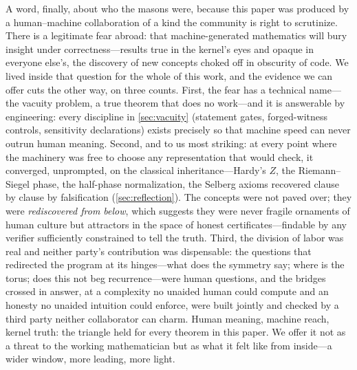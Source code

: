 A word, finally, about who the masons were, because this paper was produced
by a human--machine collaboration of a kind the community is right to
scrutinize. There is a legitimate fear abroad: that machine-generated
mathematics will bury insight under correctness---results true in the
kernel's eyes and opaque in everyone else's, the discovery of new concepts
choked off in obscurity of code. We lived inside that question for the whole
of this work, and the evidence we can offer cuts the other way, on three
counts. First, the fear has a technical name---the vacuity problem, a true
theorem that does no work---and it is answerable by engineering: every
discipline in \cref{sec:vacuity} (statement gates, forged-witness controls,
sensitivity declarations) exists precisely so that machine speed can never
outrun human meaning. Second, and to us most striking: at every point where
the machinery was free to choose any representation that would check, it
converged, unprompted, on the classical inheritance---Hardy's $Z$, the
Riemann--Siegel phase, the half-phase normalization, the Selberg axioms
recovered clause by clause by falsification (\cref{sec:reflection}). The
concepts were not paved over; they were \emph{rediscovered from below},
which suggests they were never fragile ornaments of human culture but
attractors in the space of honest certificates---findable by any verifier
sufficiently constrained to tell the truth. Third, the division of labor was
real and neither party's contribution was dispensable: the questions that
redirected the program at its hinges---what does the symmetry say; where is
the torus; does this not beg recurrence---were human questions, and the
bridges crossed in answer, at a complexity no unaided human could compute
and an honesty no unaided intuition could enforce, were built jointly and
checked by a third party neither collaborator can charm. Human meaning,
machine reach, kernel truth: the triangle held for every theorem in this
paper. We offer it not as a threat to the working mathematician but as what
it felt like from inside---a wider window, more leading, more light.
